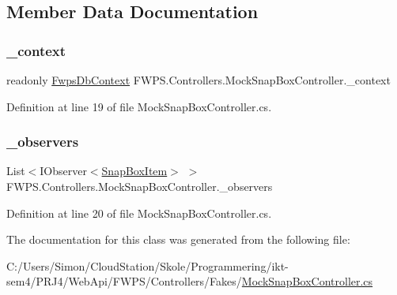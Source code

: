 \subsection{Member Data Documentation}
\mbox{\label{class_f_w_p_s_1_1_controllers_1_1_mock_snap_box_controller_ad51374eeb0f7bf4e752202efa7d80ad5}} 
\subsubsection{\texorpdfstring{\+\_\+context}{\_context}}
{\footnotesize\ttfamily readonly \mbox{\hyperlink{class_f_w_p_s_1_1_data_1_1_fwps_db_context}{Fwps\+Db\+Context}} F\+W\+P\+S.\+Controllers.\+Mock\+Snap\+Box\+Controller.\+\_\+context\hspace{0.3cm}{\ttfamily [private]}}



Definition at line 19 of file Mock\+Snap\+Box\+Controller.\+cs.

\mbox{\label{class_f_w_p_s_1_1_controllers_1_1_mock_snap_box_controller_a13d7fba95c599936c2db09c657c9728f}} 
\subsubsection{\texorpdfstring{\+\_\+observers}{\_observers}}
{\footnotesize\ttfamily List$<$I\+Observer$<$\mbox{\hyperlink{class_f_w_p_s_1_1_models_1_1_snap_box_item}{Snap\+Box\+Item}}$>$ $>$ F\+W\+P\+S.\+Controllers.\+Mock\+Snap\+Box\+Controller.\+\_\+observers\hspace{0.3cm}{\ttfamily [private]}}



Definition at line 20 of file Mock\+Snap\+Box\+Controller.\+cs.



The documentation for this class was generated from the following file\+:\begin{DoxyCompactItemize}
\item 
C\+:/\+Users/\+Simon/\+Cloud\+Station/\+Skole/\+Programmering/ikt-\/sem4/\+P\+R\+J4/\+Web\+Api/\+F\+W\+P\+S/\+Controllers/\+Fakes/\mbox{\hyperlink{_mock_snap_box_controller_8cs}{Mock\+Snap\+Box\+Controller.\+cs}}\end{DoxyCompactItemize}
